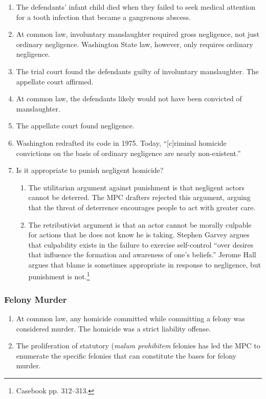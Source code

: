 \begin{enumerate}
    \item The defendants' infant child died when they failed to seek medical attention for a tooth infection that became a gangrenous abscess.
    \item At common law, involuntary manslaughter required gross negligence, not just ordinary negligence. Washington State law, however, only requires ordinary negligence.
    \item The trial court found the defendants guilty of involuntary manslaughter. The appellate court affirmed.
    \item At common law, the defendants likely would not have been convicted of manslaughter.
    \item The appellate court found negligence.
    \item Washington redrafted its code in 1975. Today, ``[c]riminal homicide convictions on the basis of ordinary negligence are nearly non-existent.''
    \item Is it appropriate to punish negligent homicide?
    \begin{enumerate}
        \item The utilitarian argument against punishment is that negligent actors cannot be deterred. The MPC drafters rejected this argument, arguing that the threat of deterrence encourages people to act with greater care.
        \item The retributivist argument is that an actor cannot be morally culpable for actions that he does not know he is taking. Stephen Garvey argues that culpability exists in the failure to exercise self-control ``over desires that influence the formation and awareness of one's beliefs.'' Jerome Hall argues that blame is sometimes appropriate in response to negligence, but punishment is not.\footnote{Casebook pp. 312--313.}
    \end{enumerate}
\end{enumerate}

\subsubsection{Felony Murder}

\begin{enumerate}
    \item At common law, any homicide committed while committing a felony was considered murder. The homicide was a strict liability offense.
    \item The proliferation of statutory (\emph{malum prohibitem} felonies has led the MPC to enumerate the specific felonies that can constitute the bases for felony murder.
\end{enumerate}

